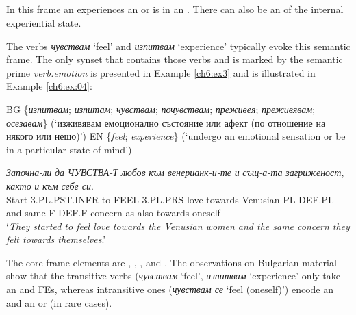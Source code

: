 \documentclass[output=paper,colorlinks,citecolor=brown]{langscibook}
\begin{document}
\subsection{}\label{ch6:sec:feeling}

\begin{description}[font=\normalfont]
\item[{Definition}:] In this frame an  experiences an  or is in an . There can also be an  of the internal experiential state.
\end{description}
The verbs \textit{чувствам} `feel'  and \textit{изпитвам} `experience' typically evoke this semantic frame. The only synset that contains those verbs and is marked by the semantic prime \textit{verb.emotion} is presented in Example \ref{ch6:ex3} and is illustrated in Example \ref{ch6:ex:04}:

\begin{exe}  
\ex  \label{ch6:ex3}
\begin{xlist}
\ex %
BG \{\textit{изпитвам}; \textit{изпитам}; \textit{чувствам}; \textit{почувствам}; \textit{преживея}; \textit{прежи\-вявам}; \textit{осезавам}\} (`изживявам емоционално състояние или афект (по отношение на някого или нещо)’)
\ex %
EN \{\textit{feel}; \textit{experience}\} (`undergo an emotional sensation or be in a particular state of mind’)
\end{xlist}
\end{exe}

\begin{exe}
\ex   \label{ch6:ex:04} 
\gll \textit{Започна-ли} \textit{да} \textit{ЧУВСТВА-Т} \textit{любов} \textit{към} \textit{венерианк-и-те} \textit{и} \textit{същ-а-та} \textit{загриженост}, \textit{както} \textit{и} \textit{към} \textit{себе си}. \\
Start-3.PL.PST.INFR to FEEL-3.PL.PRS love towards Venusian-PL-DEF.PL and same-F-DEF.F concern as also towards oneself \\
\glt `\textit{They started to feel love towards the Venusian women and the same concern they felt towards themselves}.' 

\end{exe}

 

The core frame elements are , , , and . The observations on Bulgarian material show that the transitive verbs (\textit{чувствам} `feel', \textit{изпитвам} `experience' only take an  and  FEs, whereas intransitive ones (\textit{чувствам се} `feel (oneself)') encode an  and an  or  (in rare cases). 
 
\end{document}
